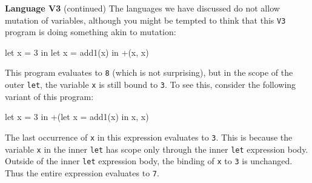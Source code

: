 \begin{minipage}[t]{\sw}
\slidenumber
\LARGE
{\bf Language V3} (continued)\exx
The languages we have discussed do not allow mutation of variables,
although you might be tempted to think that this \verb'V3' program
is doing something akin to mutation:
\Large
\begin{qv}
let
  x = 3
in
  let
    x = add1(x)
  in
    +(x, x)
\end{qv}
\LARGE
This program evaluates to \verb'8' (which is not surprising),
but in the scope of the outer \verb'let',
the variable \verb'x' is still bound to \verb'3'.
To see this, consider the following variant of this program:
\Large
\begin{qv}
let
  x = 3
in
  +(let x = add1(x) in x, x)
\end{qv}
\LARGE
The last occurrence of \verb'x' in this expression evaluates to \verb'3'.
This is because the variable \verb'x' in the inner \verb'let'
has scope only through the inner \verb'let' expression body.
Outside of the inner \verb'let' expression body,
the binding of \verb'x' to \verb'3' is unchanged.
Thus the entire expression evaluates to \verb'7'.
\end{minipage}
